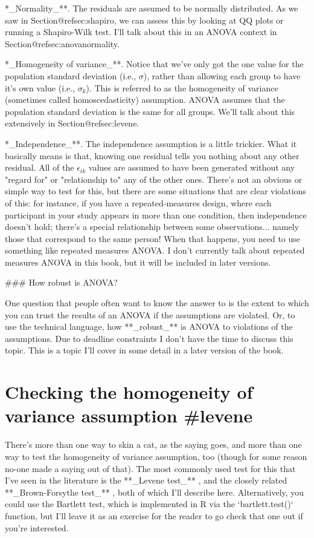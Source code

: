 \item **_Normality_**. The residuals are assumed to be normally distributed. As we saw in Section@refsec:shapiro, we can assess this by looking at QQ plots or running a Shapiro-Wilk test. I'll talk about this in an ANOVA context in Section@refsec:anovanormality. 
\item **_Homogeneity of variance_**. Notice that we've only got the one value for the population standard deviation (i.e., $\sigma$), rather than allowing each group to have it's own value (i.e., $\sigma_k$). This is referred to as the homogeneity of variance (sometimes called homoscedasticity) assumption. ANOVA assumes that the population standard deviation is the same for all groups. We'll talk about this extensively in Section@refsec:levene. 
\item **_Independence_**. The independence assumption is a little trickier. What it basically means is that, knowing one residual tells you nothing about any other residual. All of the $\epsilon_{ik}$ values are assumed to have been generated without any "regard for" or "relationship to" any of the other ones. There's not an obvious or simple way to test for this, but there are some situations that are clear violations of this: for instance, if you have a repeated-measures design, where each participant in your study appears in more than one condition, then independence doesn't hold; there's a special relationship between some observations... namely those that correspond to the same person! When that happens, you need to use something like repeated measures ANOVA. I don't currently talk about repeated measures ANOVA in this book, but it will be included in later versions. 


### How robust is ANOVA?

One question that people often want to know the answer to is the extent to which you can trust the results of an ANOVA if the assumptions are violated. Or, to use the technical language, how **_robust_** is ANOVA to violations of the assumptions. Due to deadline constraints I don't have the time to discuss this topic. This is a topic I'll cover in some detail in a later version of the book. 

\section{Checking the homogeneity of variance assumption {#levene}}

There's more than one way to skin a cat, as the saying goes, and more than one way to test the homogeneity of variance assumption, too (though for some reason no-one made a saying out of that). The most commonly used test for this that I've seen in the literature is the **_Levene test_** \cite{Levene1960}, and the closely related **_Brown-Forsythe test_** \cite{BrownForsythe1974}, both of which I'll describe here. Alternatively, you could use the Bartlett test, which is implemented in R via the `bartlett.test()` function, but I'll leave it as an exercise for the reader to go check that one out if you're interested.

